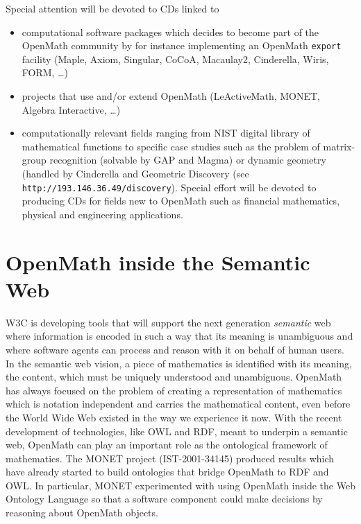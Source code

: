 \documentclass[draft]{artikel3}
\begin{document}
Special attention will be devoted to CDs linked to 
\begin{itemize}
  
\item computational software packages which decides to become part of
  the OpenMath community by for instance implementing an OpenMath
  \texttt{export} facility (Maple, Axiom, Singular, CoCoA, Macaulay2,
  Cinderella, Wiris, FORM, \ldots)
  
\item projects that use and/or extend OpenMath (LeActiveMath, MONET,
  Algebra Interactive, \ldots)
  
\item computationally relevant fields ranging from NIST digital
  library of mathematical functions to specific case studies such as
  the problem of matrix-group recognition (solvable by GAP and Magma)
  or dynamic geometry (handled by Cinderella and Geometric Discovery
(see \verb`http://193.146.36.49/discovery`). Special
  effort will be devoted to producing CDs for fields new to OpenMath
  such as financial mathematics, physical and engineering
  applications.

\end{itemize}






\section{OpenMath inside the Semantic Web}

W3C is developing tools that will support the next generation
\emph{semantic} web where information is encoded in such a way that
its meaning is unambiguous and where software agents can process and
reason with it on behalf of human users.  In the semantic web vision,
a piece of mathematics is identified with its meaning, the content,
which must be uniquely understood and unambiguous.  OpenMath has
always focused on the problem of creating a representation of
mathematics which is notation independent and carries the mathematical
content, even before the World Wide Web existed in the way we
experience it now. With the recent development of technologies, like
OWL and RDF, meant to underpin a semantic web, OpenMath can play an
important role as the ontological framework of mathematics. The MONET
project (IST-2001-34145) produced results which have already started
to build ontologies that bridge OpenMath to RDF and OWL.  In
particular, MONET experimented with using OpenMath inside the Web
Ontology Language so that a software component could make decisions by
reasoning about OpenMath objects.
\end{document}

